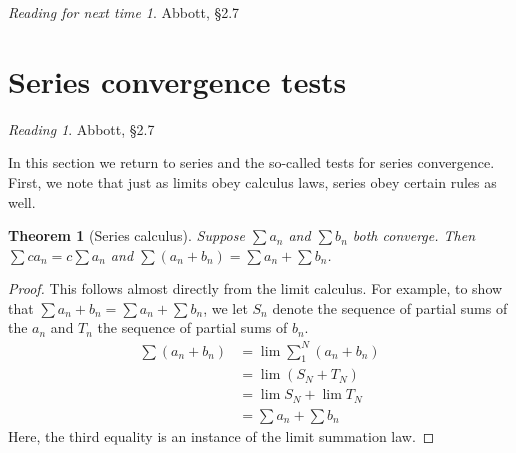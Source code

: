\documentclass[11pt,oneside]{amsbook}
\theoremstyle{definition}
\newtheorem{exerc}{Exercise}[section]
\theoremstyle{plain}
\newtheorem{theorem}{Theorem}[section]
\theoremstyle{definition}
\theoremstyle{remark}
\newtheorem*{reading}{Reading}
\newtheorem*{readnext}{Reading for next time}
\numberwithin{equation}{section}
\numberwithin{figure}{section}
\begin{document}
%

\begin{readnext}
  Abbott, \S 2.7
\end{readnext}


\newpage
\section{Series convergence tests}

\begin{reading}
  Abbott, \S 2.7
\end{reading}

In this section we return to series and the so-called tests for series convergence. First, we note that just as limits obey calculus laws, series obey certain rules as well.

\begin{theorem}[Series calculus]
  Suppose $\sum a_n$ and $\sum b_n$ both converge. Then $\sum ca_n=c\sum a_n$ and $\sum(a_n+b_n)=\sum a_n+\sum b_n$.
\end{theorem}

\begin{proof}
  This follows almost directly from the limit calculus. For example, to show that $\sum a_n+b_n=\sum a_n+\sum b_n$, we let $S_n$ denote the sequence of partial sums of the $a_n$ and $T_n$ the sequence of partial sums of $b_n$.
  \begin{align*}
    \sum(a_n+b_n)&=\lim\sum_1^N(a_n+b_n)\\
                &=\lim (S_N+T_N)\\
                &=\lim S_N+\lim T_N\\
                &=\sum a_n+\sum b_n
  \end{align*}
  Here, the third equality is an instance of the limit summation law.
\end{proof}
\end{document}
